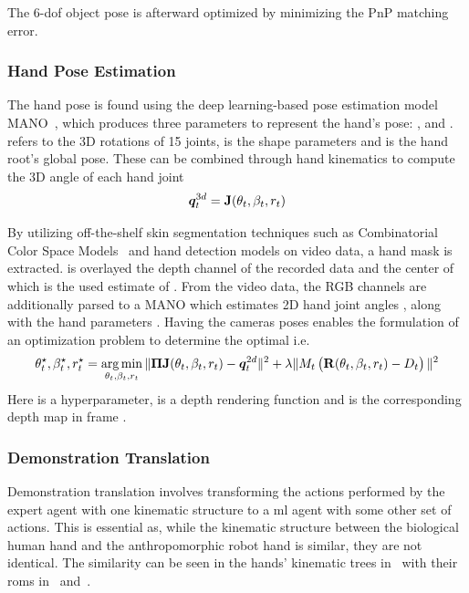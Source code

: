 The \num{6}-\gls{dof} object pose is afterward optimized by minimizing the \gls{PnP} matching error.

\subsubsection{Hand Pose Estimation}

The hand pose is found using the deep learning-based pose estimation model MANO~\cite{mano}, which produces three parameters to represent the hand's pose: , and .  refers to the 3D rotations of \num{15} joints,  is the shape
parameters and  is the hand root's global pose. These can be combined through hand kinematics to compute the 3D angle of each hand joint
%
\begin{equation}
    \bm{q}^{3d}_t = \bm{\mathrm{J}}(\theta_t,\beta_t,r_t)
\end{equation}

By utilizing off-the-shelf skin segmentation techniques such as Combinatorial Color Space Models~\cite{combinatorial-color-space-models-for-skin-detection-in-sub-continental-human-images} and hand detection models on video data, a hand mask  is extracted.  is overlayed the depth channel of the recorded data and the center of which is the used estimate of . From the video data, the RGB channels are additionally parsed to a MANO which estimates 2D hand joint angles , along with the hand parameters . Having the cameras poses \mat{\Pi} enables the formulation of an optimization problem to determine the optimal  i.e. 
%
\begin{equation}
    \theta_t^\star,\beta_t^\star, r_t^\star = \operatorname*{arg\,min}_{\theta_t,\beta_t,r_t} \| \bm{\mathrm{\Pi}} \bm{\mathrm{J}}(\theta_t,\beta_t, r_t) - \bm{q}_t^{2d} \|^2 + \lambda\| M_t \left( \bm{\mathrm{R}}(\theta_t,\beta_t,r_t) - D_t \right) \|^2
\end{equation}
Here  is a hyperparameter,  is a depth rendering function and  is the corresponding depth map in frame .

\subsubsection{Demonstration Translation}

Demonstration translation involves transforming the actions performed by the expert agent with one kinematic structure to a \gls{ml} agent with some other set of actions. This is essential as, while the kinematic structure between the biological human hand and the anthropomorphic robot hand is similar, they are not identical. The similarity can be seen in the hands' kinematic trees in~ with their \gls{rom}s in~ and~.\medskip


